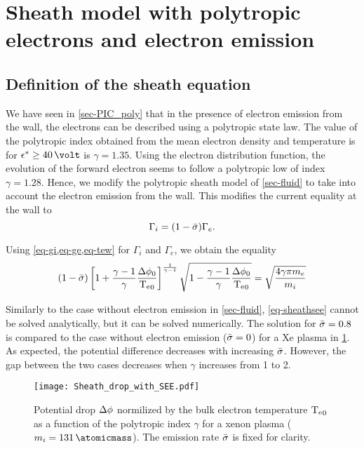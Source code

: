 
\section{Sheath model with polytropic electrons and electron emission}
\label{sec-fluid_poly_see}

\subsection{Definition of the sheath equation} \label{subsec-def_sheat_see}

We have seen in \cref{sec-PIC_poly} that in the presence of electron emission from the wall, the electrons can be described using a polytropic state law.
The value of the polytropic index obtained from the mean electron density and temperature is for $\crover \geq 40 \,\volt$ is $\gamma = 1.35$.
Using the electron distribution function, the evolution of the forward electron seems to follow a polytropic low of index $\gamma=1.28$.
Hence, we modify the polytropic sheath model of \cref{sec-fluid} to take into account the electron emission from the wall.
This modifies the current equality at the wall to
\begin{equation} \label{eq-see-J_eq}
  \Gamma_i = (1 -  \bar{\sigma }) \Gamma_e.
\end{equation}

Using \cref{eq-gi,eq-ge,eq-tew} for $\Gamma_i$ and $\Gamma_e$, we obtain the equality
\begin{equation}\label{eq-sheathsee}
  (1 -  \bar{\sigma } )\left[ 1 +\frac{\gamma -1}{\gamma} \frac{ \Delta \phi_0}{ \mathrm{T_e}_0}  \right]^{\frac{1}{\gamma - 1}} \sqrt{1 - \frac{\gamma -1}{\gamma}\frac{\Delta \phi_0}{\mathrm{T_e}_0}} = \sqrt{\frac{4 \gamma \pi m_e}{m_i}}
\end{equation}

Similarly to the case without electron emission in \cref{sec-fluid}, \cref{eq-sheathsee} cannot be solved analytically, but it can be solved numerically.
The solution for $ \bar{\sigma }=0.8$ is compared to the case without electron emission ($ \bar{\sigma }=0$) for a \ac{Xe} plasma in \cref{fig-dphi_see}.
As expected, the potential difference decreases with increasing $ \bar{\sigma }$.
However, the gap between the two cases decreases when $\gamma$ increases from 1 to 2.

\begin{figure}[hbtp]
  \centering
  \texttt{[image: Sheath\_drop\_with\_SEE.pdf]}
  \caption{Potential drop $\Delta \phi$ normilized by the bulk electron temperature $\mathrm{T_e}_0$ as a function of the polytropic index $\gamma$ for a xenon plasma ($m_i = 131\,\atomicmass$). The emission rate $ \bar{\sigma }$ is fixed for clarity.}
  \label{fig-dphi_see}
\end{figure}

